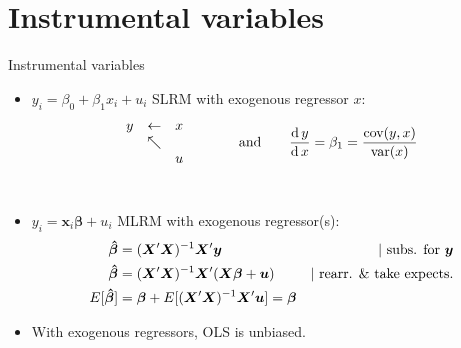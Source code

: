 \documentclass[usenames,dvipsnames]{beamer}
\begin{document}
\section{Instrumental variables}
\begin{frame}{Instrumental variables}
\begin{itemize}
    \item $y_i = \beta_0 + \beta_1 x_i + u_i$ \qquad SLRM with exogenous regressor $x$:
    $$
    \begin{matrix}
    y & \leftarrow & x \\
      & \nwarrow & \\
      & & u
    \end{matrix}
    \qquad \qquad \textnormal{and} \qquad
    \frac{\textnormal{d} \, y}{\textnormal{d} \, x} = \beta_1 = \frac{\textnormal{cov}(y,x)}{\textnormal{var}(x)}
    $$
    ~\\
    \item $y_i = \bm{x}_i \bm{\beta} + u_i$ \qquad MLRM with exogenous regressor(s):
    \begin{align*}
    \bm{\hat{\beta}} &= (\bm{X}^{\prime}\bm{X})^{-1} \bm{X}^{\prime}\bm{y} &|~ \textnormal{subs. for~} \bm{y} \\
    \bm{\hat{\beta}} &= (\bm{X}^{\prime}\bm{X})^{-1} \bm{X}^{\prime}(\bm{X \beta} + \bm{u}) &|~ \textnormal{rearr. \& take expects.} \\
    E[\bm{\hat{\beta}}] &= \bm{\beta} + E[(\bm{X}^{\prime}\bm{X})^{-1} \bm{X}^{\prime}\bm{u}] = \bm{\beta}
    \end{align*}
    \item With exogenous regressors, OLS is unbiased.
\end{itemize}
\end{frame}
\end{document}
